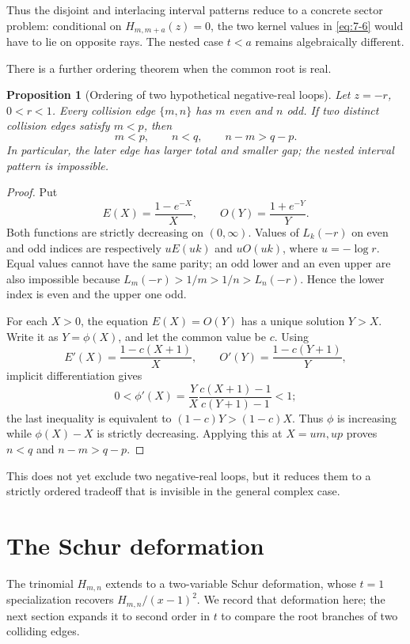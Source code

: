 \documentclass[11pt]{article}
\numberwithin{equation}{section}
\newtheorem{proposition}[theorem]{Proposition}
\theoremstyle{definition}
\begin{document}
Thus the disjoint and interlacing interval patterns reduce to a concrete
sector problem: conditional on \(H_{m,m+a}(z)=0\), the two kernel values in
\eqref{eq:7-6} would have to lie on opposite rays.  The nested case \(t<a\)
remains algebraically different.

There is a further ordering theorem when the common root is real.

\begin{proposition}[Ordering of two hypothetical negative-real loops]
\label{prop:negativeorder}
Let \(z=-r\), \(0<r<1\).  Every collision edge \(\{m,n\}\) has
\(m\) even and \(n\) odd.  If two distinct collision edges satisfy
\(m<p\), then
\begin{equation}
 m<p,\qquad n<q,\qquad n-m>q-p.
 \label{eq:7-8}
\end{equation}
In particular, the later edge has larger total and smaller gap; the nested
interval pattern is impossible.
\end{proposition}

\begin{proof}
Put
\[
 E(X)=\frac{1-e^{-X}}{X},\qquad
 O(Y)=\frac{1+e^{-Y}}{Y}.
\]
Both functions are strictly decreasing on \((0,\infty)\).  Values of
\(L_k(-r)\) on even and odd indices are respectively
\(uE(uk)\) and \(uO(uk)\), where \(u=-\log r\).  Equal values cannot have
the same parity; an odd lower and an even upper are also impossible because
\(L_m(-r)>1/m>1/n>L_n(-r)\).  Hence the lower index is even and the upper
one odd.

For each \(X>0\), the equation \(E(X)=O(Y)\) has a unique solution
\(Y>X\).  Write it as \(Y=\phi(X)\), and let the common value be \(c\).
Using
\[
 E'(X)=\frac{1-c(X+1)}{X},\qquad
 O'(Y)=\frac{1-c(Y+1)}{Y},
\]
implicit differentiation gives
\[
 0<\phi'(X)
 =\frac{Y}{X}\frac{c(X+1)-1}{c(Y+1)-1}<1;
\]
the last inequality is equivalent to
\((1-c)Y>(1-c)X\).  Thus \(\phi\) is increasing while
\(\phi(X)-X\) is strictly decreasing.  Applying this at
\(X=um,up\) proves \(n<q\) and \(n-m>q-p\).
\end{proof}

This does not yet exclude two negative-real loops, but it reduces them to a
strictly ordered tradeoff that is invisible in the general complex case.

\section{The Schur deformation}
\label{sec:schur}

The trinomial \(H_{m,n}\) extends to a two-variable Schur deformation, whose
\(t=1\) specialization recovers \(H_{m,n}/(x-1)^2\).  We record that
deformation here; the next section expands it to second order in \(t\) to
compare the root branches of two colliding edges.
\end{document}
